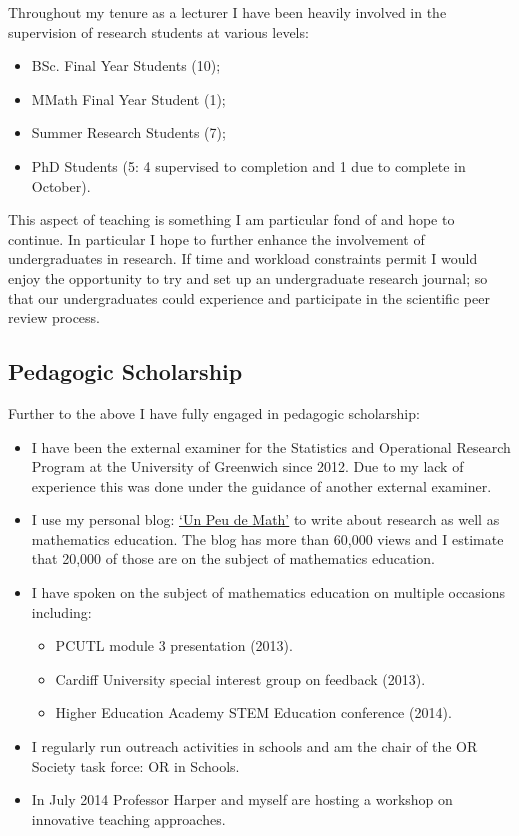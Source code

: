 \documentclass{article}
\begin{document}
Throughout my tenure as a lecturer I have been heavily involved in the supervision of research students at various levels:

\begin{itemize}
    \item BSc. Final Year Students (10);
    \item MMath Final Year Student (1);
    \item Summer Research Students (7);
    \item PhD Students (5: 4 supervised to completion and 1 due to complete in October).
\end{itemize}

This aspect of teaching is something I am particular fond of and hope to continue.
In particular I hope to further enhance the involvement of undergraduates in research.
If time and workload constraints permit I would enjoy the opportunity to try and set up an undergraduate research journal; so that our undergraduates could experience and participate in the scientific peer review process.

\subsection{Pedagogic Scholarship}

Further to the above I have fully engaged in pedagogic scholarship:

\begin{itemize}
    \item I have been the external examiner for the Statistics and Operational Research Program at the University of Greenwich since 2012.
    Due to my lack of experience this was done under the guidance of another external examiner.
    \item {I use my personal blog: \href{http://drvinceknight.blogspot.co.uk/}{`Un Peu de Math'} to write about research as well as mathematics education.
    The blog has more than 60,000 views and I estimate that 20,000 of those are on the subject of mathematics education.}
    \item I have spoken on the subject of mathematics education on multiple occasions including:
        \begin{itemize}
            \item PCUTL module 3 presentation (2013).
            \item Cardiff University special interest group on feedback (2013).
            \item Higher Education Academy STEM Education conference (2014).
        \end{itemize}
    \item I regularly run outreach activities in schools and am the chair of the OR Society task force: OR in Schools.
    \item In July 2014 Professor Harper and myself are hosting a workshop on innovative teaching approaches.
\end{itemize}
\end{document}

